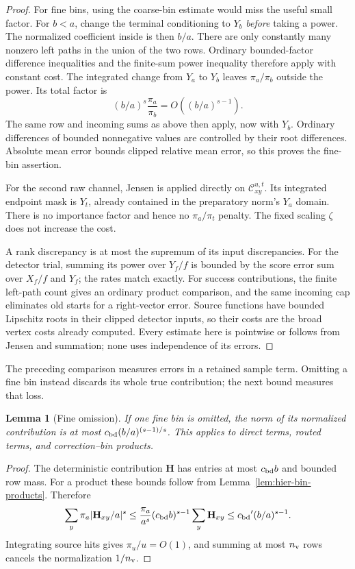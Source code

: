 \documentclass[11pt]{article}
\numberwithin{equation}{section}
\newtheorem{lemma}[theorem]{Lemma}
\theoremstyle{definition}
\theoremstyle{remark}
\begin{document}
\begin{proof}
For fine bins, using the coarse-bin estimate would miss the useful small factor. For $b<a$, change the terminal conditioning to $Y_b$ \emph{before}
taking a power.  The normalized coefficient inside is then $b/a$.
There are only constantly many nonzero left paths in the union of the
two rows.  Ordinary bounded-factor difference inequalities and the
finite-sum power inequality therefore apply with constant cost.  The
integrated change from $Y_a$ to $Y_b$ leaves $\pi_a/\pi_b$ outside the
power.  Its total factor is
\[
 (b/a)^s\frac{\pi_a}{\pi_b}=O((b/a)^{s-1}).
\]
The same row and incoming sums as above then apply, now with $Y_b$.
Ordinary differences of bounded nonnegative values are controlled by
their root differences.  Absolute mean error bounds clipped relative
mean error, so this proves the fine-bin assertion.

For the second raw channel, Jensen is applied directly on
$\mathcal C_{xy}^{u,t}$.  Its integrated endpoint mask is $Y_t$, already
contained in the preparatory norm's $Y_a$ domain.  There is no importance
factor and hence no $\pi_a/\pi_t$ penalty.  The fixed scaling $\zeta$
does not increase the cost.

A rank discrepancy is at most the supremum of its input discrepancies.
For the detector trial, summing its power over $Y_f/f$ is bounded by the
score error sum over $X_f/f$ and $Y_f$; the rates match exactly.
For success contributions, the finite left-path count gives an ordinary product
comparison, and the same incoming cap eliminates old starts for a
right-vector error.  Source functions have bounded Lipschitz roots in
their clipped detector inputs, so their costs are the broad vertex costs
already computed.  Every estimate here is pointwise or follows from
Jensen and summation; none uses independence of its errors.
\end{proof}

The preceding comparison measures errors in a retained sample term.
Omitting a fine bin instead discards its whole true contribution; the
next bound measures that loss.

\begin{lemma}[Fine omission]\label{lem:est-omission}
If one fine bin is omitted, the norm of its normalized contribution is at
most ${c_{\rm bd}}(b/a)^{(s-1)/s}$.  This applies to direct terms, routed terms, and
correction--bin products.
\end{lemma}
\begin{proof}
The deterministic contribution ${\mathbf{H}}$ has entries at most ${c_{\rm bd}}b$ and bounded
row mass.  For a product these bounds follow from
Lemma~\ref{lem:hier-bin-products}.  Therefore
\[
 \sum_y\pi_a|{\mathbf{H}}_{xy}/a|^s
 \le \frac{\pi_a}{a^s}({c_{\rm bd}}b)^{s-1}\sum_y{\mathbf{H}}_{xy}
 \le {c_{\rm bd}}'(b/a)^{s-1}.
\]
Integrating source hits gives $\pi_u/u=O(1)$, and summing at most ${n_{\rm v}}$ rows
cancels the normalization $1/{n_{\rm v}}$.
\end{proof}
\end{document}
